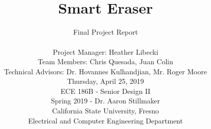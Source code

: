 \begin{filecontents*}{reference.bib}
}
	@misc{socket,
	author			={Nathan Jennings},
	title			={{Socket Programming in Python (Guide)}},
	note			={\url{https://realpython.com/python-sockets/#multi-connection-client}
	}
	
}
\end{filecontents*}

\documentclass[12pt,onecolumn]{IEEEtran}			
\usepackage{dtk-logos}						
\usepackage{graphics}
\usepackage{float}
\usepackage{caption} 
\usepackage[export]{adjustbox}
\usepackage{hyperref}
\usepackage{placeins}
\usepackage{listings}
\usepackage{color}
\usepackage{xcolor}


\hypersetup{
	colorlinks=true,
	linkcolor=black,
	filecolor=black,      
	urlcolor=black,
	citecolor=black,
}

\title{ \hfill  \vspace{2in} \\ Smart Eraser \vspace{0.05in} }	

\author{Final Project Report \\ \vspace{0.6in}
\vspace{12pt} 

Project Manager: Heather Libecki\\
\vspace{5pt}
Team Members: Chris Quesada, Juan Colin \\
\vspace{5pt}
Technical Advisors: Dr. Hovannes Kulhandjian, Mr. Roger Moore	\\			
\vspace{12pt} 								
Thursday, April 25, 2019 \\ 
\vspace{3.2in}
ECE 186B - Senior Design II \\ 					
Spring 2019 - Dr. Aaron Stillmaker \\
\vspace{5pt}
California State University, Fresno \\
Electrical and Computer Engineering Department \\ 

\vspace{2in}							


\vspace{4in}}							
										




